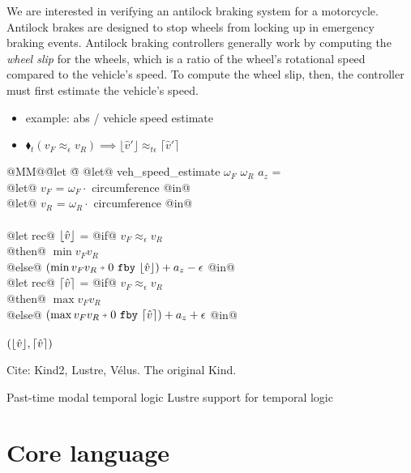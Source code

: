 \documentclass[sigplan,screen]{acmart}
\begin{document}
We are interested in verifying an antilock braking system for a motorcycle\cite{huang2010design}.
Antilock brakes are designed to stop wheels from locking up in emergency braking events.
Antilock braking controllers generally work by computing the \emph{wheel slip} for the wheels, which is a ratio of the wheel's rotational speed compared to the vehicle's speed.
To compute the wheel slip, then, the controller must first estimate the vehicle's speed.

\begin{itemize}
  \item example: abs / vehicle speed estimate
  \item $\blacklozenge_{t} (v_F \approx_{\epsilon} v_R) \implies \lfloor \hat{v}' \rfloor \approx_{t\epsilon} \lceil \hat{v}' \rceil$
\end{itemize}

\begin{tabbing}
  @MM@\= @let @\= \kill
  @let@ veh\_speed\_estimate $\omega_F$ $\omega_R$ $a_z$ = \\
    \> @let@ $v_F$ = $\omega_F \cdot $ circumference @in@ \\
    \> @let@ $v_R$ = $\omega_R \cdot $ circumference @in@ \\
    \\
    \> @let rec@ $\lfloor \hat{v} \rfloor$ = @if@ $v_F \approx_\epsilon v_R$ \\
    \> \> @then@ $\min v_F v_R$ \\
    \> \> @else@ $(\xthen{\min v_F v_R}{\xfby{0}{\floor{\hat{v}}}}) + a_z - \epsilon$ @in@ \\
    \> @let rec@ $\lceil \hat{v} \rceil$ = @if@ $v_F \approx_\epsilon v_R$ \\
    \> \> @then@ $\max v_F v_R$ \\
    \> \> @else@ $(\xthen{\max v_F v_R}{\xfby{0}{\ceil{\hat{v}}}}) + a_z + \epsilon$ @in@ \\
    \\
    \> $(\lfloor \hat{v} \rfloor, \lceil \hat{v} \rceil)$
\end{tabbing}

Cite: Kind2\cite{champion2016kind2}, Lustre\cite{caspi1995functional}, Vélus\cite{bourke2017formally}.
The original Kind\cite{hagen2008scaling}.

Past-time modal temporal logic \cite{lichtenstein1985glory}
Lustre support for temporal logic \cite{halbwachs1993executable}

\section{Core language}
\label{s:core}
\end{document}
